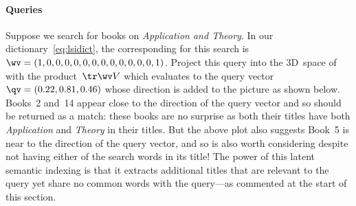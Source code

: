 \paragraph{Queries}
Suppose we search for books on \emph{Application and Theory}.
In our dictionary~\eqref{eq:lsidict}, the corresponding  for this search is \(\wv=(1,0,0,0,0,0,0,0,0,0,0,0,0,1)\).
Project this query into the 3D~space of  with the product~\(\tr\wv V\) which evaluates to the query vector \(\qv=(0.22,0.81,0.46)\) whose direction is added to the picture as shown below.
Books~2 and~14 appear close to the direction of the query vector and so should be returned as a match: these books are no surprise as both their titles have both \emph{Application} and \emph{Theory} in their titles.
But the above plot also suggests Book~5 is near to the direction of the query vector, and so is also worth considering despite not having either of the search words in its title!
The power of this latent semantic indexing is that it extracts additional titles that are relevant to the query yet share no common words with the query---as commented at the start of this section.

